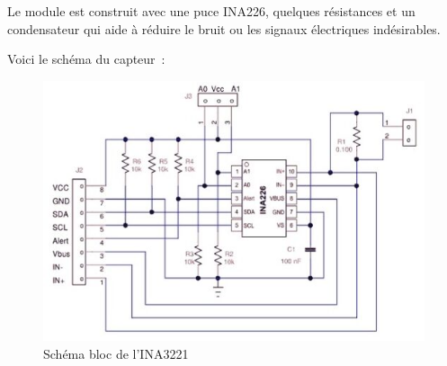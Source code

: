 	

Le module est construit avec une puce INA226, quelques résistances et un condensateur qui aide à réduire le bruit ou les signaux électriques indésirables.

Voici le schéma du capteur :

\begin{figure}[H]
	\centering
	\includegraphics[width=12cm]{./img/schemabloc226.png}
	\caption{Schéma bloc de l'INA3221 }
	\label{i1}
\end{figure}


